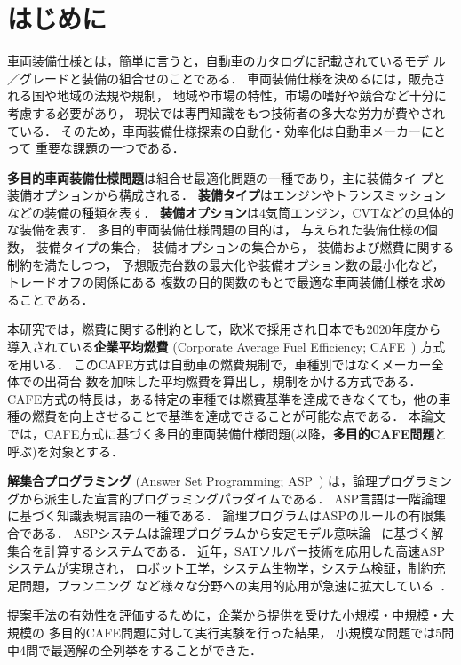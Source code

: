 \section{はじめに}\label{sec:introduction}


車両装備仕様とは，簡単に言うと，自動車のカタログに記載されているモデ
ル／グレードと装備の組合せのことである．
車両装備仕様を決めるには，販売される国や地域の法規や規制，
地域や市場の特性，市場の嗜好や競合など十分に考慮する必要があり，
現状では専門知識をもつ技術者の多大な労力が費やされている．
そのため，車両装備仕様探索の自動化・効率化は自動車メーカーにとって
重要な課題の一つである．

\textbf{多目的車両装備仕様問題}は組合せ最適化問題の一種であり，主に装備タイ
プと装備オプションから構成される．
\textbf{装備タイプ}はエンジンやトランスミッションなどの装備の種類を表す．
\textbf{装備オプション}は4気筒エンジン，CVTなどの具体的な装備を表す．
多目的車両装備仕様問題の目的は，
与えられた装備仕様の個数，
装備タイプの集合，
装備オプションの集合から，
装備および燃費に関する制約を満たしつつ，
予想販売台数の最大化や装備オプション数の最小化など，トレードオフの関係にある
複数の目的関数のもとで最適な車両装備仕様を求めることである．

本研究では，燃費に関する制約として，欧米で採用され日本でも2020年度から
導入されている\textbf{企業平均燃費}
(Corporate Average Fuel Efficiency; CAFE~\cite{metimlit18:cafe})
方式を用いる．
このCAFE方式は自動車の燃費規制で，車種別ではなくメーカー全体での出荷台
数を加味した平均燃費を算出し，規制をかける方式である．
CAFE方式の特長は，ある特定の車種では燃費基準を達成できなくても，他の車
種の燃費を向上させることで基準を達成できることが可能な点である．
本論文では，CAFE方式に基づく多目的車両装備仕様問題(以降，\textbf{多目的CAFE問題}と
呼ぶ)を対象とする．

\textbf{解集合プログラミング}
(Answer Set Programming; ASP~\cite{%
  Baral03:cambridge,%
  Gelfond88:iclp,%
  Inoue08:jssst})
は，論理プログラミングから派生した宣言的プログラミングパラダイムである．
ASP言語は一階論理に基づく知識表現言語の一種である．
論理プログラムはASPのルールの有限集合である．
ASPシステムは論理プログラムから安定モデル意味論~\cite{Gelfond88:iclp}
に基づく解集合を計算するシステムである．
近年，SATソルバー技術を応用した高速ASPシステムが実現され，
ロボット工学，システム生物学，システム検証，制約充足問題，プランニング
など様々な分野への実用的応用が急速に拡大している~\cite{Gelfond16:aim}．


提案手法の有効性を評価するために，企業から提供を受けた小規模・中規模・大規模の
多目的CAFE問題に対して実行実験を行った結果，
小規模な問題では5問中4問で最適解の全列挙をすることができた．
